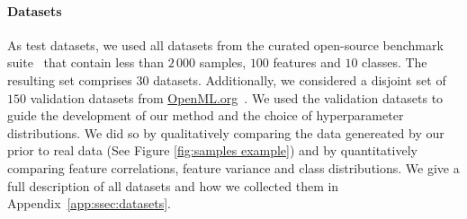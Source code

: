 \documentclass{article}
\begin{document}
\paragraph{Datasets} As test datasets, we used all datasets from the curated open-source \openmlcc{} benchmark suite~\citep{bischl-neuripsdbt21a} that contain less than $2\,000$ samples, $100$ features and $10$ classes. The resulting set comprises $30$ datasets.
Additionally, we considered a disjoint set of $150$ validation datasets from \url{OpenML.org}~\citep{vanschoren-sigkdd14a,feurer-jmlr21a}. 
We used the validation datasets to guide the development of our method and the choice of hyperparameter distributions. We did so by qualitatively comparing the data genereated by our prior to real data (See Figure \ref{fig:samples example}) and by quantitatively comparing feature correlations, feature variance and class distributions.
We give a full description of all datasets and how we collected them in Appendix~\ref{app:ssec:datasets}.
%
%
\end{document}
